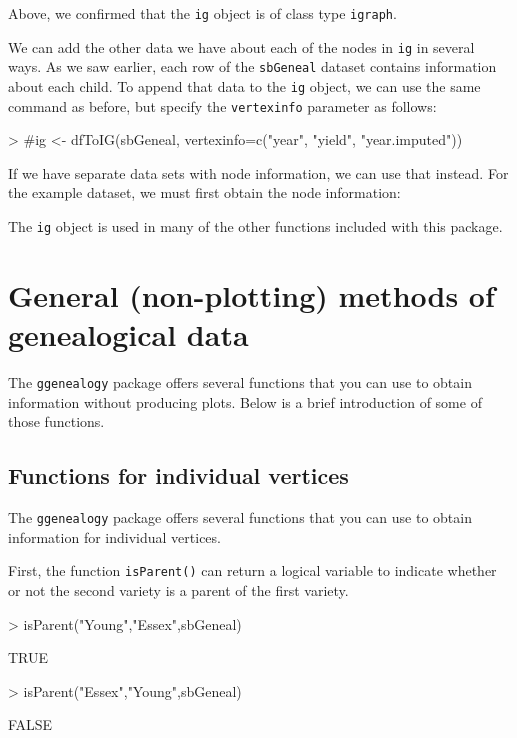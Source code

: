 \documentclass{article}
\numberwithin{equation}{section} %
\newcommand{\pkg}[1]{{\texttt{#1}}}
\begin{document}
Above, we confirmed that the \texttt{ig} object is of class type \texttt{igraph}.

We can add the other data we have about each of the nodes in \texttt{ig} in several ways. As we saw earlier, each row of the \texttt{sbGeneal} dataset contains information about each child. To append that data to the \texttt{ig} object, we can use the same command as before, but specify the \texttt{vertexinfo} parameter as follows: 

\begin{Schunk}
\begin{Sinput}
> #ig <- dfToIG(sbGeneal, vertexinfo=c("year", "yield", "year.imputed"))
\end{Sinput}
\end{Schunk}

If we have separate data sets with node information, we can use that instead. For the example dataset, we must first obtain the node information: 

The \texttt{ig} object is used in many of the other functions included with this package. 

\section{General (non-plotting) methods of genealogical data}

The \pkg{ggenealogy} package offers several functions that you can use to obtain information without producing plots. Below is a brief introduction of some of those functions.

\subsection{Functions for individual vertices}

The \pkg{ggenealogy} package offers several functions that you can use to obtain information for individual vertices.

First, the function \texttt{isParent()} can return a logical variable to indicate whether or not the second variety is a parent of the first variety.

\begin{Schunk}
\begin{Sinput}
> isParent("Young","Essex",sbGeneal)
\end{Sinput}
\begin{Soutput}
[1] TRUE
\end{Soutput}
\begin{Sinput}
> isParent("Essex","Young",sbGeneal)
\end{Sinput}
\begin{Soutput}
[1] FALSE
\end{Soutput}
\end{Schunk}
\end{document}
